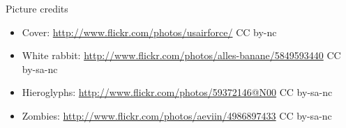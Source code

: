 \begin{frame}[plain]{Picture credits}
  \scriptsize
  \begin{itemize}
    \item Cover: \url{http://www.flickr.com/photos/usairforce/} CC by-nc
    \item White rabbit: \url{http://www.flickr.com/photos/alles-banane/5849593440} CC by-sa-nc
    \item Hieroglyphs: \url{http://www.flickr.com/photos/59372146@N00} CC by-sa-nc
    \item Zombies: \url{http://www.flickr.com/photos/aeviin/4986897433} CC by-sa-nc
  \end{itemize}
\end{frame}
